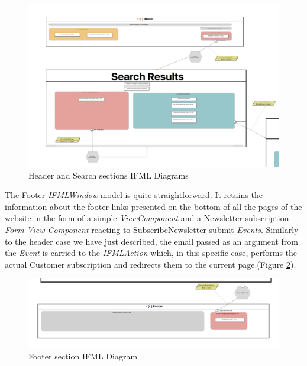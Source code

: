 \vspace{0.5cm}
\begin{figure}[H]
  \centering
    \includegraphics[width=12cm]{images/diagrams/before/ifml-header-search.png}
  \caption{Header and Search sections IFML Diagrams}
  \label{fig:ifml-before-header-search}
\end{figure}
\vspace{0.5cm}

The Footer \textit{IFMLWindow} model is quite straightforward. It retains the information about the footer links presented on the bottom of all the pages of the website in the form of a simple \textit{ViewComponent} and a Newsletter subscription \textit{Form View Component} reacting to SubscribeNewsletter submit \textit{Events}. Similarly to the header case we have just described, the email passed as an argument from the \textit{Event} is carried to the \textit{IFMLAction} which, in this specific case, performs the actual Customer subscription and redirects them to the current page.(Figure \ref{fig:ifml-before-footer}).

\vspace{0.5cm}
\begin{figure}[H]
  \centering
    \includegraphics[width=12cm]{images/diagrams/before/ifml-footer.png}
  \caption{Footer section IFML Diagram}
  \label{fig:ifml-before-footer}
\end{figure}
\vspace{0.5cm}

